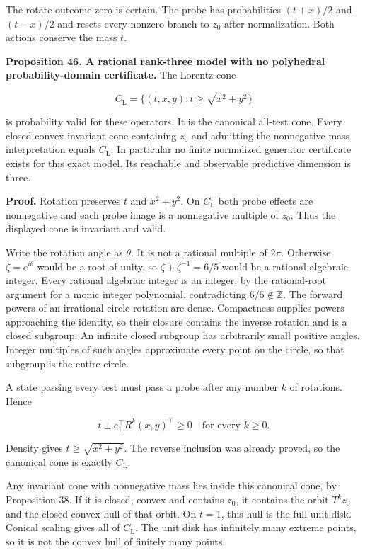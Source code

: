 \documentclass[11pt,letterpaper]{article}
\begin{document}
The rotate outcome zero is certain. The probe has probabilities
\((t+x)/2\) and \((t-x)/2\) and resets every nonzero branch to \(z_0\)
after normalization. Both actions conserve the mass \(t\).

\textbf{Proposition 46. A rational rank-three model with no polyhedral
probability-domain certificate.} The Lorentz cone

\[
C_{\mathrm L}=\{(t,x,y):t\geq\sqrt{x^2+y^2}\}
\]

is probability valid for these operators. It is the canonical all-test
cone. Every closed convex invariant cone containing \(z_0\) and
admitting the nonnegative mass interpretation equals \(C_{\mathrm L}\).
In particular no finite normalized generator certificate exists for this
exact model. Its reachable and observable predictive dimension is three.

\textbf{Proof.} Rotation preserves \(t\) and \(x^2+y^2\). On
\(C_{\mathrm L}\) both probe effects are nonnegative and each probe
image is a nonnegative multiple of \(z_0\). Thus the displayed cone is
invariant and valid.

Write the rotation angle as \(\theta\). It is not a rational multiple of
\(2\pi\). Otherwise \(\zeta=e^{i\theta}\) would be a root of unity, so
\(\zeta+\zeta^{-1}=6/5\) would be a rational algebraic integer. Every
rational algebraic integer is an integer, by the rational-root argument
for a monic integer polynomial, contradicting \(6/5\notin\mathbb Z\).
The forward powers of an irrational circle rotation are dense.
Compactness supplies powers approaching the identity, so their closure
contains the inverse rotation and is a closed subgroup. An infinite
closed subgroup has arbitrarily small positive angles. Integer multiples
of such angles approximate every point on the circle, so that subgroup
is the entire circle.

A state passing every test must pass a probe after any number \(k\) of
rotations. Hence

\[
t\pm e_1^\top R^k(x,y)^\top\geq0
\quad\text{for every }k\geq0.
\]

Density gives \(t\geq\sqrt{x^2+y^2}\). The reverse inclusion was already
proved, so the canonical cone is exactly \(C_{\mathrm L}\).

Any invariant cone with nonnegative mass lies inside this canonical
cone, by Proposition 38. If it is closed, convex and contains \(z_0\),
it contains the orbit \(T^kz_0\) and the closed convex hull of that
orbit. On \(t=1\), this hull is the full unit disk. Conical scaling
gives all of \(C_{\mathrm L}\). The unit disk has infinitely many
extreme points, so it is not the convex hull of finitely many points.
\end{document}
